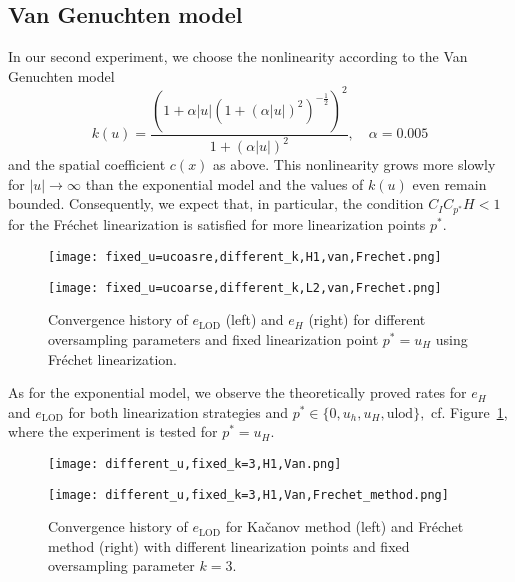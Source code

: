 \documentclass{article}
\begin{document}
\subsection{Van Genuchten model}
In our second experiment, we choose the nonlinearity according to the Van Genuchten model
 \[ k(u)=\frac{(1+\alpha |u|(1+(\alpha |u|)^2)^{-\frac{1}{2}})^2}{1+(\alpha|u|)^2},\quad \alpha=0.005 \]
and the spatial coefficient $c(x)$ as above. This nonlinearity grows more slowly for $|u|\to \infty$ than the exponential model and the values of $k(u)$ even remain bounded. Consequently, we expect that, in particular, the condition $C_IC_{p^*}H<1$ for the Fréchet linearization is satisfied for more linearization points $p^*$. 
\begin{figure}[ht]
    \centering
     \begin{minipage}{0.49\textwidth}
         \centering  
    \texttt{[image: fixed\_u=ucoasre,different\_k,H1,van,Frechet.png]} 
     
      
    \end{minipage}
    \hfill
    \begin{minipage}{0.49\textwidth}
       \centering  
    \texttt{[image: fixed\_u=ucoarse,different\_k,L2,van,Frechet.png]} 
     
    \end{minipage}
   
   \caption{Convergence history of $e_{\operatorname{LOD}}$ (left) and $e_H$ (right) for different oversampling parameters and fixed linearization point $p^{*}=u_H$ using Fréchet linearization.}\label{ex1}
\end{figure}
As for the exponential model, we observe the theoretically proved rates for $e_H$ and $e_{\operatorname{LOD}}$ for both linearization strategies and $p^*\in\{0,u_h, u_H, \text{ulod}\}, $ cf. Figure~\ref{ex1}, where the experiment is tested for $p^*=u_H$. 
\begin{figure}[ht]
    \centering
    \begin{minipage}{0.49\textwidth}
         \centering  
    \texttt{[image: different\_u,fixed\_k=3,H1,Van.png]} 
     
     
    \end{minipage}
    \hfill
    \begin{minipage}{0.49\textwidth}
       \centering  
    \texttt{[image: different\_u,fixed\_k=3,H1,Van,Frechet\_method.png]} 
      
    \end{minipage}
  
    
    \caption{Convergence history of $e_{\operatorname{LOD}}$ for Kačanov method (left) and Fréchet method (right) with different linearization points and fixed oversampling parameter $k=3$.}\label{Different_methods_and_linearization_points}
\end{figure}
\end{document}
